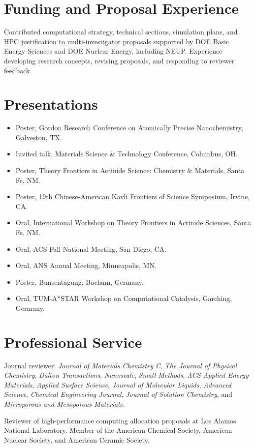 \documentclass[10pt]{article}
\newcommand{\dated}[2]{\item[{\color{muted}#1}] #2}
\begin{document}
\section{Funding and Proposal Experience}

Contributed computational strategy, technical sections, simulation plans, and HPC justification to
multi-investigator proposals supported by DOE Basic Energy Sciences and DOE Nuclear Energy,
including NEUP. Experience developing research concepts, revising proposals, and responding to
reviewer feedback.

\section{Presentations}

\begin{itemize}[leftmargin=5.4em, labelwidth=4.6em, labelsep=0.8em, align=left]
  \dated{Feb.\ 2024}{Poster, Gordon Research Conference on Atomically Precise Nanochemistry,
    Galveston, TX.}
  \dated{Oct.\ 2023}{Invited talk, Materials Science \& Technology Conference, Columbus, OH.}
  \dated{Feb.\ 2023}{Poster, Theory Frontiers in Actinide Science: Chemistry \& Materials, Santa
    Fe, NM.}
  \dated{Jul.\ 2022}{Poster, 19th Chinese-American Kavli Frontiers of Science Symposium, Irvine,
    CA.}
  \dated{Feb.\ 2020}{Oral, International Workshop on Theory Frontiers in Actinide Sciences, Santa
    Fe, NM.}
  \dated{Aug.\ 2019}{Oral, ACS Fall National Meeting, San Diego, CA.}
  \dated{Jun.\ 2019}{Oral, ANS Annual Meeting, Minneapolis, MN.}
  \dated{May 2015}{Poster, Bunsentagung, Bochum, Germany.}
  \dated{Mar.\ 2014}{Oral, TUM-A*STAR Workshop on Computational Catalysis, Garching, Germany.}
\end{itemize}

\section{Professional Service}

Journal reviewer: \emph{Journal of Materials Chemistry C}, \emph{The Journal of Physical
Chemistry}, \emph{Dalton Transactions}, \emph{Nanoscale}, \emph{Small Methods}, \emph{ACS Applied
Energy Materials}, \emph{Applied Surface Science}, \emph{Journal of Molecular Liquids},
\emph{Advanced Science}, \emph{Chemical Engineering Journal}, \emph{Journal of Solution
Chemistry}, and \emph{Microporous and Mesoporous Materials}.\par\vspace{3pt}
Reviewer of high-performance computing allocation proposals at Los Alamos National Laboratory.
Member of the American Chemical Society, American Nuclear Society, and American Ceramic Society.
\end{document}

